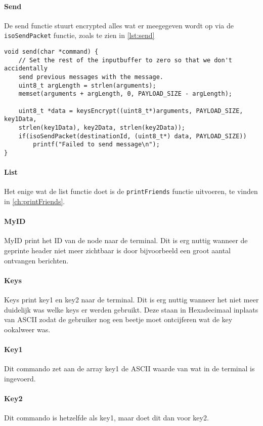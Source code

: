 \paragraph*{Send}
De send functie stuurt encrypted alles wat er meegegeven wordt op via de \texttt{isoSendPacket} functie, zoals te zien in \autoref{lst:send}
\begin{lstlisting}[caption={De send functie},captionpos=b,label={lst:send},style=c,xleftmargin=.\textwidth,xrightmargin=.\textwidth]
void send(char *command) {
    // Set the rest of the inputbuffer to zero so that we don't accidentally 
    send previous messages with the message.
    uint8_t argLength = strlen(arguments);
    memset(arguments + argLength, 0, PAYLOAD_SIZE - argLength);

    uint8_t *data = keysEncrypt((uint8_t*)arguments, PAYLOAD_SIZE, key1Data, 
    strlen(key1Data), key2Data, strlen(key2Data));
    if(isoSendPacket(destinationId, (uint8_t*) data, PAYLOAD_SIZE)) 
        printf("Failed to send message\n");      
}
\end{lstlisting}


\paragraph*{List}
Het enige wat de list functie doet is de \texttt{printFriends} functie uitvoeren, te vinden in \autoref{ch:printFriends}.


\paragraph*{MyID}
MyID print het ID van de node naar de terminal. Dit is erg nuttig wanneer de geprinte header niet meer zichtbaar is door bijvoorbeeld een groot aantal ontvangen berichten.

\paragraph*{Keys}
Keys print key1 en key2 naar de terminal. Dit is erg nuttig wanneer het niet meer duidelijk was welke keys er werden gebruikt. Deze staan in Hexadecimaal inplaats van ASCII zodat de gebruiker nog een beetje moet ontcijferen wat de key ookalweer was.

\paragraph*{Key1}
Dit commando zet aan de array key1 de ASCII waarde van wat in de terminal is ingevoerd. 

\paragraph*{Key2}
Dit commando is hetzelfde als key1, maar doet dit dan voor key2.